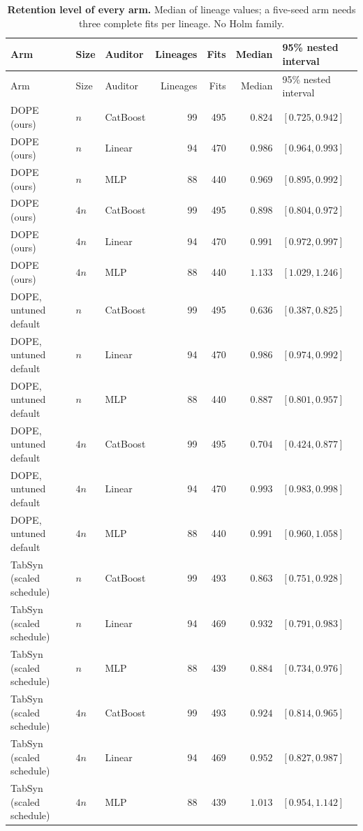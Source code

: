\begin{longtable}{@{}p{1.6in}llrrrl@{}}
\caption{\textbf{Retention level of every arm.} Median of lineage values; a five-seed arm needs three complete fits per lineage. No Holm family.}\label{tab:v2-levels}\\
\toprule
Arm & Size & Auditor & Lineages & Fits & Median & 95\% nested interval \\
\midrule
\endfirsthead
\toprule
Arm & Size & Auditor & Lineages & Fits & Median & 95\% nested interval \\
\midrule
\endhead
DOPE (ours) & $n$ & CatBoost & 99 & 495 & $0.824$ & $[0.725, 0.942]$ \\
DOPE (ours) & $n$ & Linear & 94 & 470 & $0.986$ & $[0.964, 0.993]$ \\
DOPE (ours) & $n$ & MLP & 88 & 440 & $0.969$ & $[0.895, 0.992]$ \\
DOPE (ours) & $4n$ & CatBoost & 99 & 495 & $0.898$ & $[0.804, 0.972]$ \\
DOPE (ours) & $4n$ & Linear & 94 & 470 & $0.991$ & $[0.972, 0.997]$ \\
DOPE (ours) & $4n$ & MLP & 88 & 440 & $1.133$ & $[1.029, 1.246]$ \\
DOPE, untuned default & $n$ & CatBoost & 99 & 495 & $0.636$ & $[0.387, 0.825]$ \\
DOPE, untuned default & $n$ & Linear & 94 & 470 & $0.986$ & $[0.974, 0.992]$ \\
DOPE, untuned default & $n$ & MLP & 88 & 440 & $0.887$ & $[0.801, 0.957]$ \\
DOPE, untuned default & $4n$ & CatBoost & 99 & 495 & $0.704$ & $[0.424, 0.877]$ \\
DOPE, untuned default & $4n$ & Linear & 94 & 470 & $0.993$ & $[0.983, 0.998]$ \\
DOPE, untuned default & $4n$ & MLP & 88 & 440 & $0.991$ & $[0.960, 1.058]$ \\
TabSyn (scaled schedule) & $n$ & CatBoost & 99 & 493 & $0.863$ & $[0.751, 0.928]$ \\
TabSyn (scaled schedule) & $n$ & Linear & 94 & 469 & $0.932$ & $[0.791, 0.983]$ \\
TabSyn (scaled schedule) & $n$ & MLP & 88 & 439 & $0.884$ & $[0.734, 0.976]$ \\
TabSyn (scaled schedule) & $4n$ & CatBoost & 99 & 493 & $0.924$ & $[0.814, 0.965]$ \\
TabSyn (scaled schedule) & $4n$ & Linear & 94 & 469 & $0.952$ & $[0.827, 0.987]$ \\
TabSyn (scaled schedule) & $4n$ & MLP & 88 & 439 & $1.013$ & $[0.954, 1.142]$ \\

\end{longtable}
